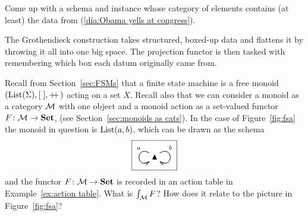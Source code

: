 \documentclass[CT4S-EN-RU]{subfiles}
\begin{document}
\begin{applicationRUS}
\end{applicationRUS}

\begin{exerciseENG}
Come up with a schema and instance whose category of elements contains (at least) the data from (\ref{dia:Obama yells at congress}).
\end{exerciseENG}

\begin{exerciseRUS}
\end{exerciseRUS}

\begin{sloganENG}
The Grothendieck construction takes structured, boxed-up data and flattens it by throwing it all into one big space. The projection functor is then tasked with remembering which box each datum originally came from.
\end{sloganENG}

\begin{sloganRUS}
\end{sloganRUS}

\begin{exerciseENG}\label{exc:FSM as elements of monoid action}
Recall from Section~\ref{sec:FSMs} that a finite state machine is a free monoid $(\textnormal{List}(\Sigma),[\;],+\!\!+\hspace{1pt})$ acting on a set $X$. Recall also that we can consider a monoid as a category $\mathcal{M}$ with one object and a monoid action as a set-valued functor $F\colon\mathcal{M}\rightarrow{\mathbf{Set}}$, (see Section~\ref{sec:monoids as cats}). In the case of Figure~\ref{fig:fsa} the monoid in question is $\textnormal{List}(a,b)$, which can be drawn as the schema
$$\fbox{\xymatrix{\monOb\ar@(ul,dl)[]_(.3)a\ar@(ul,dl)[]_(.7){~}\ar@(ur,dr)[]^(.3)b\ar@(ur,dr)[]^(.7){~}}}$$
and the functor $F\colon\mathcal{M}\rightarrow{\mathbf{Set}}$ is recorded in an action table in Example~\ref{ex:action table}. What is $\int_\mathcal{M} F$? How does it relate to the picture in Figure~\ref{fig:fsa}?
\end{exerciseENG}

\begin{exerciseRUS}\label{exc:FSM as elements of monoid action}
\end{exerciseRUS}


\subsection{}
\end{document}
